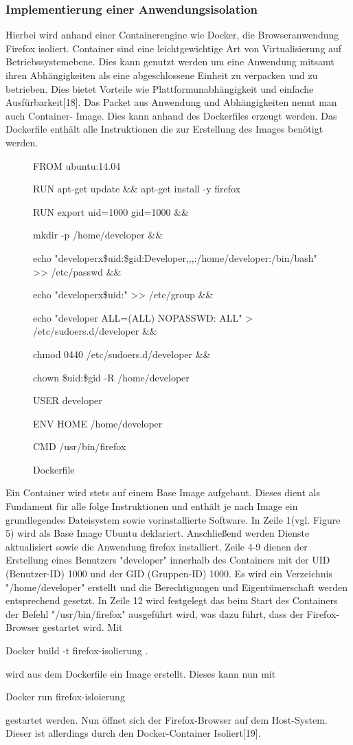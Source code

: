\documentclass[journal=tosc,final]{iacrtrans}
\begin{document}
\subsubsection{Implementierung einer Anwendungsisolation}
Hierbei wird anhand einer Containerengine wie Docker, die Browseranwendung Firefox isoliert.
Container sind eine leichtgewichtige Art von Virtualisierung auf Betriebssystemebene. Dies kann genutzt werden um eine Anwendung mitsamt ihren Abhängigkeiten als eine abgeschlossene Einheit zu verpacken und zu betrieben.
Dies bietet Vorteile wie Plattformunabhängigkeit und einfache Ausfürbarkeit[18].
Das Packet aus Anwendung und Abhängigkeiten nennt man auch Container-
Image. Dies kann anhand des Dockerfiles erzeugt werden. Das Dockerfile
enthält alle Instruktionen die zur Erstellung des Images benötigt werden.
\begin{figure}[h]
\caption{Dockerfile }
\begin{shaded}
\begin{internallinenumbers}
FROM ubuntu:14.04

RUN apt-get update \&\& apt-get install -y firefox

RUN export uid=1000 gid=1000 \&\& \

mkdir -p /home/developer \&\& \

echo "developerx\${uid}:\${gid}:Developer,,,:/home/developer:/bin/bash" >> /etc/passwd \&\& \

echo "developerx\${uid}:" >> /etc/group \&\& \

echo "developer ALL=(ALL) NOPASSWD: ALL" > /etc/sudoers.d/developer \&\& \

chmod 0440 /etc/sudoers.d/developer \&\& \

chown \${uid}:\${gid} -R /home/developer

USER developer

ENV HOME /home/developer

CMD /usr/bin/firefox

 \end{internallinenumbers}
\end{shaded}
\end{figure}

Ein Container wird stets auf einem Base Image aufgebaut. Dieses dient als
Fundament für alle folge Instruktionen und enthält je nach Image ein grundlegendes Dateisystem sowie vorinstallierte Software.
In Zeile 1(vgl. Figure 5) wird als Base Image Ubuntu deklariert. Anschließend werden Dienste aktualisiert sowie die Anwendung firefox installiert. Zeile 4-9 dienen der Erstellung eines Benutzers "developer" innerhalb des Containers mit der UID (Benutzer-ID) 1000 und der GID (Gruppen-ID) 1000. Es wird ein Verzeichnis "/home/developer" erstellt und die Berechtigungen und Eigentümerschaft werden entsprechend gesetzt. In Zeile 12 wird festgelegt das beim Start des Containers der Befehl "/usr/bin/firefox" ausgeführt wird, was dazu führt, dass der Firefox-Browser gestartet wird. Mit \colorbox{mshadecolor}{\parbox{0.38\textwidth}{Docker build -t firefox-isolierung .}} wird aus dem Dockerfile ein Image erstellt. Dieses kann nun mit \colorbox{mshadecolor}{\parbox{0.31\textwidth}{Docker run firefox-isloierung}} gestartet werden. Nun öffnet sich der Firefox-Browser auf dem Host-System. Dieser ist allerdings durch den Docker-Container Isoliert[19].
\end{document}
